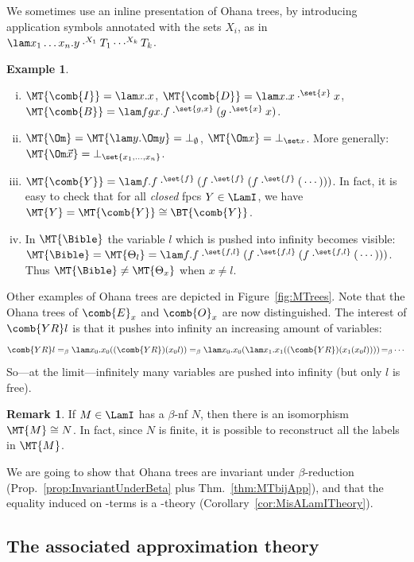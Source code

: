 \documentclass[10pt,a4paper]{amsart}
\theoremstyle{definition}
\newtheorem{example}[theorem]{Example}
\newtheorem{remark}[theorem]{Remark}
\newcommand{\bsub}{\begin{enumerate}[(i)]}
\newcommand{\esub}{\end{enumerate}}
\begin{document}
We sometimes use an inline presentation of Ohana trees, 
by introducing application symbols annotated with the sets $X_i$, as in 
$\lam x_1\ldots x_n.y\cdot^{X_1}T_1\cdots^{X_k}T_k$.
\begin{example}\label{ex:MTs}\mbox{}
\bsub
\item $\MT{\comb{I}} = \lam x.x$, $\MT{\comb{D}} = \lam x.x\cdot^{\set{x}}x$, $\MT{\comb{B}} = \lam fgx.f\cdot^{\set{g,x}}(g\cdot^{\set{x}}x)$.
\item $\MT{\Om} = \MT{\lam y.\Om y} = \bot_{\emptyset}$, $\MT{\Om x} = \bot_{\set x}$. More generally: $\MT{\Om \vec x} = \bot_{\set{x_1,\dots,x_n}}$. 
\item  $\MT{\comb{Y}} = \lam f.f\cdot^{\set{f}}(f\cdot^{\set{f}}(f\cdot^{\set{f}}(\,\cdots)))$. 
	In fact, it is easy to check that for all \emph{closed} fpcs $Y\in\LamI$, we have $\MT{Y} = \MT{\comb{Y}} \cong \BT{\comb{Y}}$.
\item In $\MT{\Bible}$ the variable $l$ which is pushed into infinity becomes visible: $\MT{\Bible} =\MT{\Theta_l} = \lam f.f\cdot^{\set{f,l}}(f\cdot^{\set{f,l}}(f\cdot^{\set{f,l}}(\,\cdots)))$. Thus $\MT{\Bible} \neq \MT{\Theta_x}$ when $x\neq l$.
\esub
\end{example}

Other examples of Ohana trees are depicted in Figure~\ref{fig:MTrees}.
Note that the Ohana trees of $\comb{E}_x$ and $\comb{O}_x$ are now distinguished.
The interest of ${\comb{YR}l}$ is that it pushes into infinity an increasing amount of variables: 
\[\comb{YR}l =_\beta \lam x_0.x_0((\comb{YR})(x_0l)) =_\beta \lam x_0.x_0(\lam x_1.x_1((\comb{YR})(x_1(x_0l))))\, {=_\beta} \cdots\]
So---at the limit---infinitely many variables are pushed into infinity (but only $l$ is free).

\begin{remark} If $M\in\LamI$ has a $\beta$-nf $N$, then there is an isomorphism $\MT{M}\cong N$.
In fact, since $N$ is finite, it is possible to reconstruct all the labels in $\MT{M}$.  
\end{remark}

We are going to show that Ohana trees are invariant under $\beta$-reduction (Prop.~\ref{prop:InvariantUnderBeta} plus Thm.~\ref{thm:MTbijApp}), and that the equality induced on \lamI-terms is a \lamI-theory (Corollary~\ref{cor:MisALamITheory}).

\subsection{The associated approximation theory}
\end{document}
